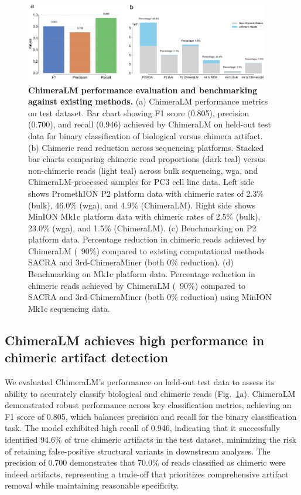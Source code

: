 \documentclass[pdflatex,sn-nature]{sn-jnl}%
\theoremstyle{thmstyleone}%
\theoremstyle{thmstyletwo}%
\theoremstyle{thmstylethree}%
\begin{document}
\begin{figure}[!ht]
	\begin{center}
		\includegraphics[width=0.95\textwidth]{final_figures/figure2}
	\end{center}
	\caption{{\bf ChimeraLM performance evaluation and benchmarking against existing methods.}
		(a) ChimeraLM performance metrics on test dataset. Bar chart showing F1 score (0.805), precision (0.700), and recall (0.946) achieved by ChimeraLM on held-out test data for binary classification of biological versus chimera artifact.
		(b) Chimeric read reduction across sequencing platforms. Stacked bar charts comparing chimeric read proportions (dark teal) versus non-chimeric reads (light teal) across bulk sequencing, \gls{wga}, and ChimeraLM-processed samples for PC3 cell line data. Left side shows PromethION P2 platform data with chimeric rates of 2.3\% (bulk), 46.0\% (\gls{wga}), and 4.9\% (ChimeraLM). Right side shows MinION Mk1c platform data with chimeric rates of 2.5\% (bulk), 23.0\% (\gls{wga}), and 1.5\% (ChimeraLM).
		(c) Benchmarking on P2 platform data. Percentage reduction in chimeric reads achieved by ChimeraLM (~90\%) compared to existing computational methods SACRA and 3rd-ChimeraMiner (both 0\% reduction).
		(d) Benchmarking on Mk1c platform data. Percentage reduction in chimeric reads achieved by ChimeraLM (~90\%) compared to SACRA and 3rd-ChimeraMiner (both 0\% reduction) using MinION Mk1c sequencing data.}\label{fig:figure2}
\end{figure}

\subsection*{ChimeraLM achieves high performance in chimeric artifact detection}

We evaluated ChimeraLM's performance on held-out test data to assess its ability to accurately classify biological and chimeric reads (Fig.~\ref{fig:figure2}a).
ChimeraLM demonstrated robust performance across key classification metrics, achieving an F1 score of 0.805, which balances precision and recall for the binary classification task.
The model exhibited high recall of 0.946, indicating that it successfully identified 94.6\% of true chimeric artifacts in the test dataset, minimizing the risk of retaining false-positive structural variants in downstream analyses.
The precision of 0.700 demonstrates that 70.0\% of reads classified as chimeric were indeed artifacts, representing a trade-off that prioritizes comprehensive artifact removal while maintaining reasonable specificity.
\end{document}
